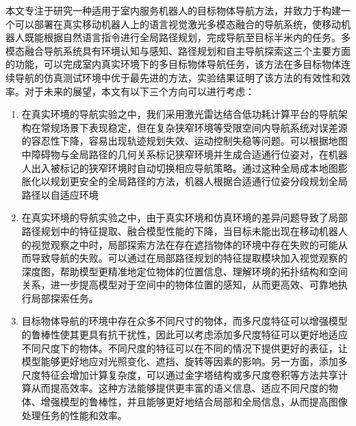 本文专注于研究一种适用于室内服务机器人的目标物体导航方法，并致力于构建一个可以部署在真实移动机器人上的语言视觉激光多模态融合的导航系统，使移动机器人既能根据自然语言指令进行全局路径规划，完成导航至目标半米内的任务。多模态融合导航系统具有环境认知与感知、路径规划和自主导航探索这三个主要方面的功能，可以完成室内真实环境下的多目标物体导航任务，该方法在多目标物体连续导航的仿真测试环境中优于最先进的方法，实验结果证明了该方法的有效性和效率。对于未来的展望，本文有以下三个方向可以进行考虑：
\begin{enumerate}[topsep = 0 pt, itemsep= 0 pt, parsep=0pt, partopsep=0pt, leftmargin=44pt, itemindent=0pt, labelsep=6pt, label=(\arabic*)]
    \item 	在真实环境的导航实验之中，我们采用激光雷达结合低功耗计算平台的导航架构在常规场景下表现稳定，但在复杂狭窄环境等受限空间内导航系统对误差源的容忍性下降，容易出现轨迹规划失效、运动控制失稳等问题。可以根据地图中障碍物与全局路径的几何关系标记狭窄环境并生成合适通行位姿对，在机器人出入被标记的狭窄环境时自动切换相应导航策略。通过这种全局成本地图膨胀化以规划更安全的全局路径的方法，机器人根据合适通行位姿分段规划全局路径以自适应环境
    \item	在真实环境的导航实验之中，由于真实环境和仿真环境的差异问题导致了局部路径规划中的特征提取、融合模型性能的下降，当目标未能出现在移动机器人的视觉观察之中时，局部探索方法在存在遮挡物体的环境中存在失败的可能从而导致导航的失败。可以通过在局部路径规划的特征提取模块加入视觉观察的深度图，帮助模型更精准地定位物体的位置信息、理解环境的拓扑结构和空间关系，进一步提高模型对于空间中的物体位置的感知，从而更高效、可靠地执行局部探索任务。
    \item	目标物体导航的环境中存在众多不同尺寸的物体，而多尺度特征可以增强模型的鲁棒性使其更具有抗干扰性，因此可以考虑添加多尺度特征可以更好地适应不同尺度下的物体。不同尺度的特征可以在不同的情况下提供更好的表征，让模型能够更好地应对光照变化、遮挡、旋转等因素的影响。另一方面，添加多尺度特征会增加计算复杂度，可以通过金字塔结构或多尺度卷积等方法共享计算从而提高效率。这种方法能够提供更丰富的语义信息、适应不同尺度的物体、增强模型的鲁棒性，并且能够更好地结合局部和全局信息，从而提高图像处理任务的性能和效率。 
    
\end{enumerate}


